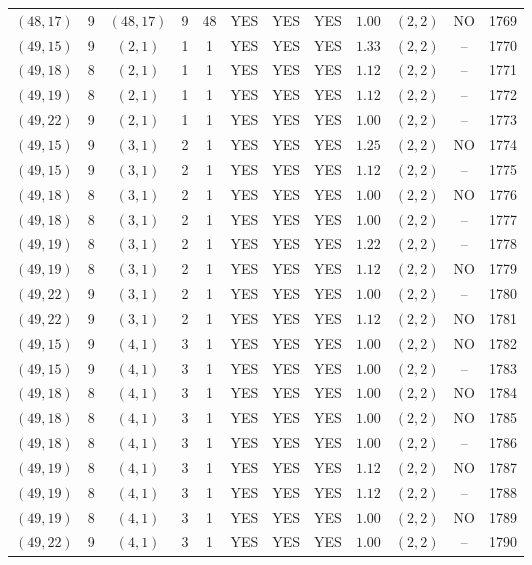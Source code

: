 \begin{longtable}{|c|c|c|c|c|c|c|c|c|c|c|c|}
$(48,17)$ & 9 & $(48,17)$ & 9 & 48 & YES & YES & YES & $1.00$ & $(2,2)$ & NO & 1769\\
$(49,15)$ & 9 & $(2,1)$ & 1 & 1 & YES & YES & YES & $1.33$ & $(2,2)$ & -- & 1770\\
$(49,18)$ & 8 & $(2,1)$ & 1 & 1 & YES & YES & YES & $1.12$ & $(2,2)$ & -- & 1771\\
$(49,19)$ & 8 & $(2,1)$ & 1 & 1 & YES & YES & YES & $1.12$ & $(2,2)$ & -- & 1772\\
$(49,22)$ & 9 & $(2,1)$ & 1 & 1 & YES & YES & YES & $1.00$ & $(2,2)$ & -- & 1773\\
$(49,15)$ & 9 & $(3,1)$ & 2 & 1 & YES & YES & YES & $1.25$ & $(2,2)$ & NO & 1774\\
$(49,15)$ & 9 & $(3,1)$ & 2 & 1 & YES & YES & YES & $1.12$ & $(2,2)$ & -- & 1775\\
$(49,18)$ & 8 & $(3,1)$ & 2 & 1 & YES & YES & YES & $1.00$ & $(2,2)$ & NO & 1776\\
$(49,18)$ & 8 & $(3,1)$ & 2 & 1 & YES & YES & YES & $1.00$ & $(2,2)$ & -- & 1777\\
$(49,19)$ & 8 & $(3,1)$ & 2 & 1 & YES & YES & YES & $1.22$ & $(2,2)$ & -- & 1778\\
$(49,19)$ & 8 & $(3,1)$ & 2 & 1 & YES & YES & YES & $1.12$ & $(2,2)$ & NO & 1779\\
$(49,22)$ & 9 & $(3,1)$ & 2 & 1 & YES & YES & YES & $1.00$ & $(2,2)$ & -- & 1780\\
$(49,22)$ & 9 & $(3,1)$ & 2 & 1 & YES & YES & YES & $1.12$ & $(2,2)$ & NO & 1781\\
$(49,15)$ & 9 & $(4,1)$ & 3 & 1 & YES & YES & YES & $1.00$ & $(2,2)$ & NO & 1782\\
$(49,15)$ & 9 & $(4,1)$ & 3 & 1 & YES & YES & YES & $1.00$ & $(2,2)$ & -- & 1783\\
$(49,18)$ & 8 & $(4,1)$ & 3 & 1 & YES & YES & YES & $1.00$ & $(2,2)$ & NO & 1784\\
$(49,18)$ & 8 & $(4,1)$ & 3 & 1 & YES & YES & YES & $1.00$ & $(2,2)$ & NO & 1785\\
$(49,18)$ & 8 & $(4,1)$ & 3 & 1 & YES & YES & YES & $1.00$ & $(2,2)$ & -- & 1786\\
$(49,19)$ & 8 & $(4,1)$ & 3 & 1 & YES & YES & YES & $1.12$ & $(2,2)$ & NO & 1787\\
$(49,19)$ & 8 & $(4,1)$ & 3 & 1 & YES & YES & YES & $1.12$ & $(2,2)$ & -- & 1788\\
$(49,19)$ & 8 & $(4,1)$ & 3 & 1 & YES & YES & YES & $1.00$ & $(2,2)$ & NO & 1789\\
$(49,22)$ & 9 & $(4,1)$ & 3 & 1 & YES & YES & YES & $1.00$ & $(2,2)$ & -- & 1790\\

\end{longtable}
